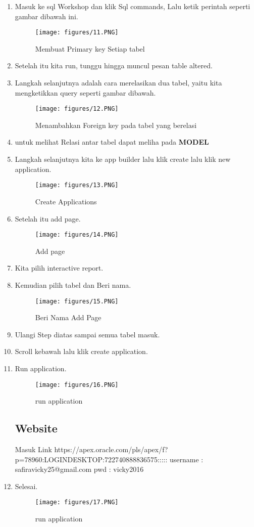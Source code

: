 \begin{enumerate}
\item Masuk ke sql Workshop dan klik Sql commands, Lalu ketik perintah seperti gambar dibawah ini.
\begin{figure}[!htbp]
\centering
\texttt{[image: figures/11.PNG]}
\caption{Membuat Primary key Setiap tabel}
\label{penanda}
\end{figure}
\item Setelah itu kita run, tunggu hingga muncul pesan table altered.
\item Langkah selanjutnya adalah cara merelasikan dua tabel, yaitu kita mengketikkan query seperti gambar dibawah.
\begin{figure}[!htbp]
\centering
\texttt{[image: figures/12.PNG]}
\caption{Menambahkan Foreign key pada tabel yang berelasi}
\label{penanda}
\end{figure}
\item untuk melihat Relasi antar tabel dapat meliha pada \textbf{MODEL}
\item Langkah selanjutnya kita ke app builder lalu klik create lalu klik new application.
\begin{figure}[!htbp]
\centering
\texttt{[image: figures/13.PNG]}
\caption{Create Applications}
\label{penanda}
\end{figure}
\item  Setelah itu add page.
\begin{figure}[!htbp]
\centering
\texttt{[image: figures/14.PNG]}
\caption{Add page}
\label{penanda}
\end{figure}
\item Kita pilih interactive report.
\item Kemudian pilih tabel dan Beri nama.
\begin{figure}[!htbp]
\centering
\texttt{[image: figures/15.PNG]}
\caption{Beri Nama Add Page}
\label{penanda}
\end{figure}
\item Ulangi Step diatas sampai semua tabel masuk.
\item  Scroll kebawah lalu klik create application.
\item Run application.
\begin{figure}[!htbp]
\centering
\texttt{[image: figures/16.PNG]}
\caption{run application}
\label{penanda}
\end{figure}
\subsection{Website} 
\par Masuk Link https://apex.oracle.com/pls/apex/f?p=78960:LOGINDESKTOP:722740888836575:::::
username : safiravicky25@gmail.com
pwd : vicky2016

\item Selesai.
\begin{figure}[!htbp]
\centering
\texttt{[image: figures/17.PNG]}
\caption{run application}
\label{penanda}
\end{figure}
\end{enumerate}